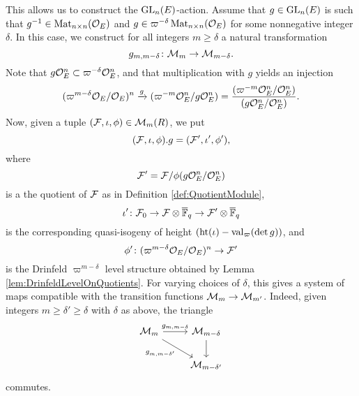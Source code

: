 \documentclass[../main.tex]{subfiles}
\begin{document}
This allows us to construct the $\operatorname{GL}_n(E)$-action. Assume that $g \in \operatorname{GL}_n(E)$ is such that $g^{-1} \in \operatorname{Mat}_{n\times
n}(\mathcal{O}_E)$ and $g \in \varpi^{-\delta} \operatorname{Mat}_{n \times n}(\mathcal{O}_E)$ for some nonnegative
integer $\delta$. In this case, we construct for all integers $m \geq \delta$ a natural
transformation
\begin{equation*}
  g_{m, m-\delta}\colon \mathcal{M}_m \to \mathcal{M}_{m-\delta}.
\end{equation*}
Note that $g \mathcal{O}_E^n \subset \varpi^{-\delta} \mathcal{O}_E^n$, and that multiplication with
$g$ yields an injection
\begin{equation*}
  (\varpi^{m-\delta}\mathcal{O}_E/\mathcal{O}_E)^n \xrightarrow{g} (\varpi^{-m}\mathcal{O}_E^n/g\mathcal{O}_E^n) = 
  \frac{(\varpi^{-m} \mathcal{O}_E^n /\mathcal{O}_E^n)}{(g \mathcal{O}_E^n/\mathcal{O}_E^n)}.
\end{equation*}
Now, given a tuple $(\mathcal{F}, \iota, \phi) \in \mathcal{M}_m(R)$, we put $$(\mathcal{F}, \iota, \phi).g = (\mathcal{F}', \iota', \phi'),$$ where 
$$\mathcal{F}'= \mathcal{F}/\phi(g\mathcal{O}_E^n/\mathcal{O}_E^n)$$ 
is a the quotient of $\mathcal{F}$ as in Definition \ref{def:QuotientModule}, 
$$\iota'\colon \mathcal{F}_0 \to \mathcal{F} \otimes \overline {\mathbb{F}}_q \to \mathcal{F}' \otimes \overline {\mathbb{F}}_q$$ 
is the corresponding quasi-isogeny of height 
$(\textnormal{ht}(\iota) - \mathrm{val}_\varpi( \det g))$, and 
$$\phi'\colon (\varpi^{m-\delta}\mathcal{O}_E/\mathcal{O}_E)^n \to \mathcal{F}'$$ 
is the Drinfeld $\varpi^{m-\delta}$ level structure obtained by Lemma
\ref{lem:DrinfeldLevelOnQuotients}. 
For varying choices of $\delta$, this gives a system of maps compatible with the 
transition functions $\mathcal{M}_m \to \mathcal{M}_{m'}$. Indeed, given integers $m \geq \delta'
\geq \delta$ with $\delta$ as above, the triangle 
\begin{equation*}
\begin{tikzcd}[ampersand replacement=\&]
	{\cM_{m}} \& {\cM_{m-\delta}} \\
	\& {\cM_{m-\delta'}}
	\arrow["{g_{m,m-\delta}}", from=1-1, to=1-2]
	\arrow["{g_{m,m-\delta'}}"', from=1-1, to=2-2]
	\arrow[from=1-2, to=2-2]
\end{tikzcd}
\end{equation*}
commutes.
\end{document}

